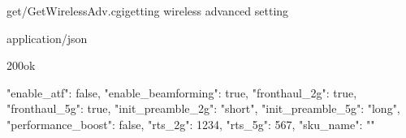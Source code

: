 \documentclass[12pt,a4paper]{article}
\begin{document}
\begin{apiRoute}{get}{/GetWirelessAdv.cgi}{getting wireless advanced setting}
	
	\begin{routeParameter}
	
	\end{routeParameter}
	\begin{routeResponse}{application/json}
		\begin{routeResponseItem}{200}{ok}
			\begin{routeResponseItemBody}
{
  "enable_atf": false,
  "enable_beamforming": true,
  "fronthaul_2g": true,
  "fronthaul_5g": true,
  "init_preamble_2g": "short",
  "init_preamble_5g": "long",
  "performance_boost": false,
  "rts_2g": 1234,
  "rts_5g": 567,
  "sku_name": ""
}
			\end{routeResponseItemBody}
		\end{routeResponseItem}
	\end{routeResponse}
	
\end{apiRoute}
\end{document}
